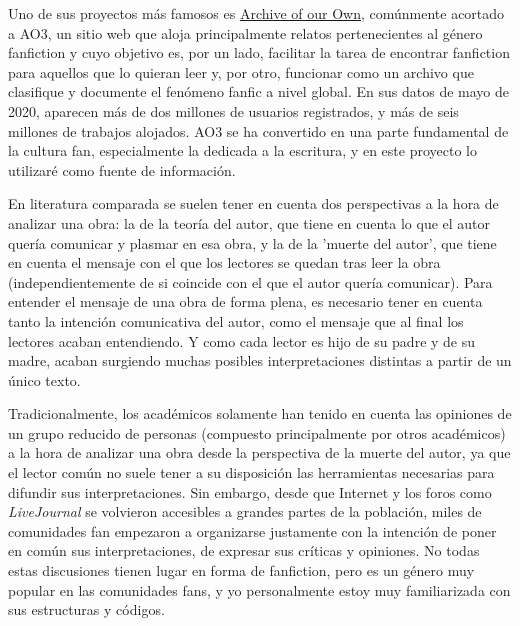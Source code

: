 \documentclass{pre-tfg}
\begin{document}
Uno de sus proyectos más famosos es \href{https://www.archiveofourown.org/}{Archive of our Own}, comúnmente acortado a AO3, un sitio web que aloja principalmente relatos pertenecientes al género fanfiction y cuyo objetivo es, por un lado, facilitar la tarea de encontrar fanfiction para aquellos que lo quieran leer y, por otro, funcionar como un archivo que clasifique y documente el fenómeno fanfic a nivel global. En sus datos de mayo de 2020, aparecen más de dos millones de usuarios registrados, y más de seis millones de trabajos alojados. AO3 se ha convertido en una parte fundamental de la cultura fan, especialmente la dedicada a la escritura, y en este proyecto lo utilizaré como fuente de información.


En literatura comparada se suelen tener en cuenta dos perspectivas a la hora de analizar una obra: la de la teoría del autor, que tiene en cuenta lo que el autor quería comunicar y plasmar en esa obra, y la de la 'muerte del autor'\cite{Barthes}, que tiene en cuenta el mensaje con el que los lectores se quedan tras leer la obra (independientemente de si coincide con el que el autor quería comunicar).
Para entender el mensaje de una obra de forma plena\cite{ellis_2018}, es necesario tener en cuenta tanto la intención comunicativa del autor, como el mensaje que al final los lectores acaban entendiendo. Y como cada lector es hijo de su padre y de su madre, acaban surgiendo muchas posibles interpretaciones distintas a partir de un único texto.

Tradicionalmente, los académicos solamente han tenido en cuenta las opiniones de un grupo reducido de personas (compuesto principalmente por otros académicos) a la hora de analizar una obra desde la perspectiva de la muerte del autor, ya que el lector común no suele tener a su disposición las herramientas necesarias para difundir sus interpretaciones. Sin embargo, desde que Internet y los foros como \textit{LiveJournal} se volvieron accesibles a grandes partes de la población, miles de comunidades fan empezaron a organizarse justamente con la intención de poner en común sus interpretaciones, de expresar sus críticas y opiniones. No todas estas discusiones tienen lugar en forma de fanfiction, pero es un género muy popular en las comunidades fans, y yo personalmente estoy muy familiarizada con sus estructuras y códigos.
\end{document}
